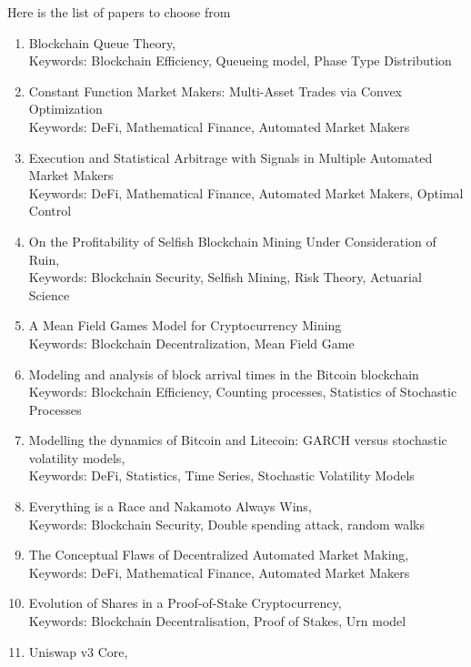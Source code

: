 \documentclass[11pt]{article}
\begin{document}
Here is the list of papers to choose from 
\begin{enumerate}
	\item Blockchain Queue Theory, \cite{Li2018} \\
	Keywords: Blockchain Efficiency, Queueing model, Phase Type Distribution
	\item Constant Function Market Makers: Multi-Asset Trades via Convex Optimization \cite{Angeris2022}\\
	Keywords: DeFi, Mathematical Finance, Automated Market Makers
	\item Execution and Statistical Arbitrage with Signals in Multiple
Automated Market Makers \cite{Cartea2023}\\
	Keywords: DeFi, Mathematical Finance, Automated Market Makers, Optimal Control
	\item On the Profitability of Selfish Blockchain Mining Under
Consideration of Ruin, \cite{Hansjoerg2022OR}\\
	Keywords: Blockchain Security, Selfish Mining, Risk Theory, Actuarial Science 
	\item A Mean Field Games Model for Cryptocurrency Mining \cite{Li2024}\\
	Keywords: Blockchain Decentralization, Mean Field Game
	\item Modeling and analysis of block arrival times in the
Bitcoin blockchain \cite{Bowden2020}\\
	Keywords: Blockchain Efficiency, Counting processes, Statistics of Stochastic Processes
	\item Modelling the dynamics of Bitcoin and Litecoin:
GARCH versus stochastic volatility models, \cite{Tiwari2019}\\
	Keywords: DeFi, Statistics, Time Series, Stochastic Volatility Models
	
	\item Everything is a Race and Nakamoto Always Wins, \cite{Dembo2020}\\
	Keywords: Blockchain Security, Double spending attack, random walks
	\item The Conceptual Flaws of Decentralized Automated
Market Making, \cite{Park2023}\\
Keywords: DeFi, Mathematical Finance, Automated Market Makers
	\item Evolution of Shares in a Proof-of-Stake Cryptocurrency, \cite{Rosu2021}\\
Keywords: Blockchain Decentralisation, Proof of Stakes, Urn model
	\item Uniswap v3 Core, \cite{Adams2021}\\

\end{enumerate}


\end{document}
